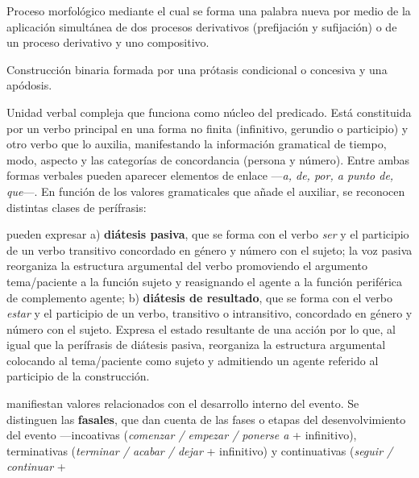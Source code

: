 \begin{glosariogeneral}
  \item[Parasíntesis:] Proceso morfológico mediante el cual se forma una palabra
        nueva por medio de la aplicación simultánea de dos procesos derivativos
        (prefijación y sufijación) o de un proceso derivativo y uno compositivo.
  \item[Período hipotético:] Construcción binaria formada por una prótasis
        condicional o concesiva y una apódosis.
  \item[Perífrasis verbal:] Unidad verbal compleja que funciona como núcleo del
        predicado. Está constituida por un verbo principal en una forma no
        finita (infinitivo, gerundio o participio) y otro verbo que lo auxilia,
        manifestando la información gramatical de tiempo, modo, aspecto y las
        categorías de concordancia (persona y número). Entre ambas formas
        verbales pueden aparecer elementos de enlace ---\textit{a, de, por, a
        punto de, que}---. En función de los valores gramaticales que añade el
        auxiliar, se reconocen distintas clases de perífrasis:
    \begin{glosario}
      \item[de diátesis:] pueden expresar a) \textbf{diátesis pasiva}, que se
            forma con el verbo \textit{ser} y el participio de un verbo
            transitivo concordado en género y número con el sujeto; la voz
            pasiva reorganiza la estructura argumental del verbo promoviendo el
            argumento tema/paciente a la función sujeto y reasignando el agente
            a la función periférica de complemento agente; b) \textbf{diátesis
            de resultado}, que se forma con el verbo \textit{estar} y el
            participio de un verbo, transitivo o intransitivo, concordado en
            género y número con el sujeto. Expresa el estado resultante de una
            acción por lo que, al igual que la perífrasis de diátesis pasiva,
            reorganiza la estructura argumental colocando al tema/paciente como
            sujeto y admitiendo un agente referido al participio de la
            construcción.
      \item[aspectuales:] manifiestan valores relacionados con el desarrollo
            interno del evento. Se distinguen las \textbf{fasales}, que dan
            cuenta de las fases o etapas del desenvolvimiento del evento
            ---incoativas (\textit{comenzar / empezar / ponerse a} +
            infinitivo), terminativas (\textit{terminar / acabar / dejar} +
            infinitivo) y continuativas (\textit{seguir / continuar} +

\end{glosario}
\end{glosariogeneral}
